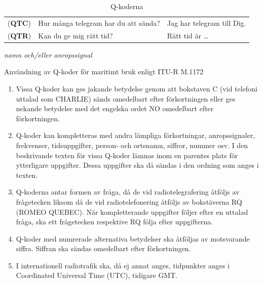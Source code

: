 \begin{table}
\begin{threeparttable}
\begin{tabular}{lp{6cm}p{6cm}}
    (\textbf{QTC}) & Hur många telegram har du att sända? & Jag har telegram till Dig. \\
    (\textbf{QTR}) & Kan du ge mig rätt tid? & Rätt tid är \dots \\
  \end{tabular}
  \vspace{1em}
  \begin{tablenotes}
  \item [*] \emph{namn och/eller anropssignal}
  \end{tablenotes}
  \end{threeparttable}
  \caption{Q-koderna}
	\label{tab:q-kod}
\end{table}

Användning av Q-koder för maritimt bruk enligt ITU-R M.1172
\begin{enumerate}
	\item Vissa Q-koder kan ges jakande betydelse genom att bokstaven C
	(vid telefoni uttalad som CHARLIE) sänds omedelbart efter
	förkortningen eller ges nekande betydelse med det engelska ordet NO
	omedelbart efter förkortningen.
	\item Q-koder kan kompletteras med andra lämpliga förkortningar,
	anropssignaler, frekvenser, tidsuppgifter, person- och ortsnamn,
	siffror, nummer osv. I den beskrivande texten för vissa Q-koder
	lämnas inom en parentes plats för ytterligare uppgifter. Dessa
	uppgifter ska då sändas i den ordning som anges i texten.
	\item Q-koderna antar formen av fråga, då de vid radiotelegrafering
	åtföljs av frågetecken liksom då de vid radiotelefonering åtföljs av
	bokstäverna RQ (ROMEO QUEBEC). När kompletterande uppgifter följer
	efter en uttalad fråga, ska ett frågetecken respektive RQ följa
	efter uppgifterna.
	\item Q-koder med numrerade alternativa betydelser ska åtföljas av
	motsvarande siffra. Siffran ska sändas omedelbart efter
	förkortningen.
	\item I internationell radiotrafik ska, då ej annat anges,
	tidpunkter anges i Coordinated Universal Time (UTC), tidigare GMT.
\end{enumerate}
